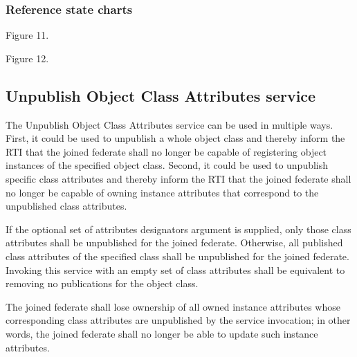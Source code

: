 \begin{compactstdpage}
    \subsubsection{Reference state charts}
    \begin{stdalphalist}
        \item Figure 11.
        \item Figure 12.
    \end{stdalphalist}

    \subsection{Unpublish Object Class Attributes service}

    The Unpublish Object Class Attributes service can be used in multiple ways. First, it could be used to unpublish a whole object class and thereby inform the RTI that the joined federate shall no longer be capable of registering object instances of the specified object class. Second, it could be used to unpublish specific class attributes and thereby inform the RTI that the joined federate shall no longer be capable of owning instance attributes that correspond to the unpublished class attributes.

    If the optional set of attributes designators argument is supplied, only those class attributes shall be unpublished for the joined federate. Otherwise, all published class attributes of the specified class shall be unpublished for the joined federate. Invoking this service with an empty set of class attributes shall be equivalent to removing no publications for the object class.

    The joined federate shall lose ownership of all owned instance attributes whose corresponding class attributes are unpublished by the service invocation; in other words, the joined federate shall no longer be able to update such instance attributes.
\end{compactstdpage}

\clearpage


